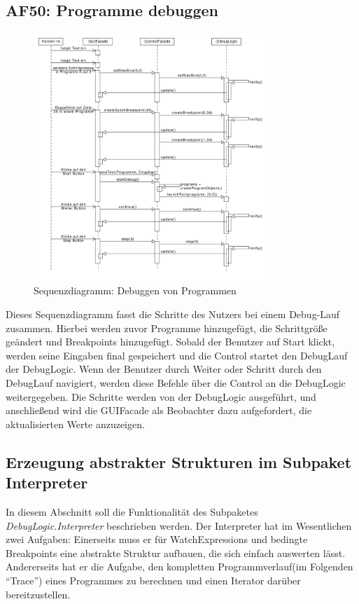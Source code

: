 \documentclass[parskip=full]{scrartcl}
\begin{document}
\newpage
\subsection{AF50: Programme debuggen}
\begin{figure}[!h]
\centering
\includegraphics[width=0.8\textwidth]{diagrammIdeenUmlet/SequenceDiagrams/seq_AF50PDF.pdf}
\caption{Sequenzdiagramm: Debuggen von Programmen}
\end{figure}
Dieses Sequenzdiagramm fasst die Schritte des Nutzers bei einem Debug-Lauf zusammen.
Hierbei werden zuvor Programme hinzugefügt, die Schrittgröße geändert und Breakpoints hinzugefügt.
Sobald der Benutzer auf Start klickt, werden seine Eingaben final gespeichert und die Control startet 
den DebugLauf der DebugLogic.
Wenn der Benutzer durch Weiter oder Schritt durch den DebugLauf navigiert, werden diese Befehle über
die Control an die DebugLogic weitergegeben. Die Schritte werden von der DebugLogic ausgeführt, und anschließend
wird die GUIFacade als Beobachter dazu aufgefordert, die aktualisierten Werte anzuzeigen.
\subsection{Erzeugung abstrakter Strukturen im Subpaket Interpreter}
In diesem Abschnitt soll die Funktionalität des Subpaketes \textit{DebugLogic.Interpreter} beschrieben werden. Der Interpreter hat im Wesentlichen zwei Aufgaben: Einerseits muss er für WatchExpressions und bedingte Breakpoints eine abstrakte Struktur aufbauen, die sich einfach auswerten lässt. Andererseits hat er die Aufgabe, den kompletten Programmverlauf(im Folgenden \enquote{Trace})  eines Programmes zu berechnen und einen Iterator darüber bereitzustellen.
\end{document}
